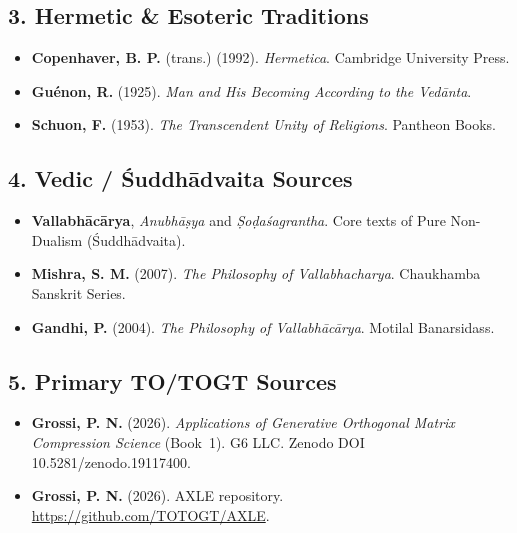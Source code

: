 \subsection{3. Hermetic \& Esoteric Traditions}

\begin{itemize}
\item \textbf{Copenhaver, B. P.} (trans.) (1992). \emph{Hermetica}. Cambridge University Press.
\item \textbf{Gu\'enon, R.} (1925). \emph{Man and His Becoming According to the Ved\=anta}.
\item \textbf{Schuon, F.} (1953). \emph{The Transcendent Unity of Religions}. Pantheon Books.
\end{itemize}

\subsection{4. Vedic / \'{S}uddh\=advaita Sources}

\begin{itemize}
\item \textbf{Vallabh\=ac\=arya}, \emph{Anubh\=a\d{s}ya} and \emph{\d{S}o\d{d}a\'{s}agrantha}. Core texts of Pure Non-Dualism (\'{S}uddh\=advaita).
\item \textbf{Mishra, S. M.} (2007). \emph{The Philosophy of Vallabhacharya}. Chaukhamba Sanskrit Series.
\item \textbf{Gandhi, P.} (2004). \emph{The Philosophy of Vallabh\=ac\=arya}. Motilal Banarsidass.
\end{itemize}

\subsection{5. Primary TO/TOGT Sources}  %

\begin{itemize}
\item \textbf{Grossi, P. N.} (2026). \emph{Applications of Generative Orthogonal Matrix Compression Science} (Book~1). G6 LLC. Zenodo DOI 10.5281/zenodo.19117400.
\item \textbf{Grossi, P. N.} (2026). AXLE repository. \url{https://github.com/TOTOGT/AXLE}.
\end{itemize}

